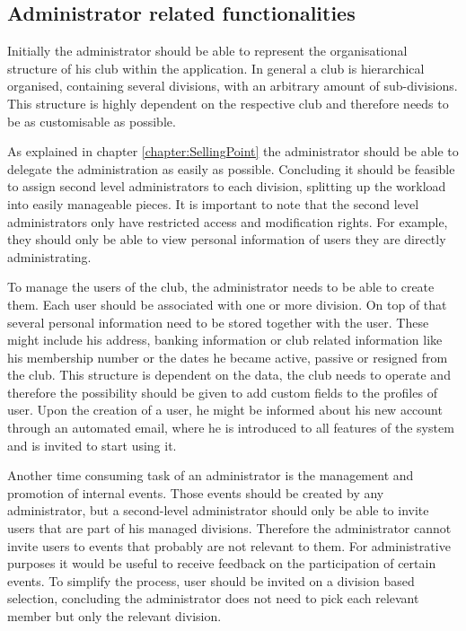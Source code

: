 \subsection{Administrator related functionalities}

Initially the administrator should be able to represent the organisational structure of his club within the application. In general a club is hierarchical organised, containing several divisions, with an arbitrary amount of sub-divisions. This structure is highly dependent on the respective club and therefore needs to be as customisable as possible. 

As explained in chapter \vref{chapter:SellingPoint} the administrator should be able to delegate the administration as easily as possible. Concluding it should be feasible to assign second level administrators to each division, splitting up the workload into easily manageable pieces. It is important to note that the second level administrators only have restricted access and modification rights. For example, they should only be able to view personal information of users they are directly administrating.

To manage the users of the club, the administrator needs to be able to create them. Each user should be associated with one or more division. On top of that several personal information need to be stored together with the user. These might include his address, banking information or club related information like his membership number or the dates he became active, passive or resigned from the club. This structure is dependent on the data, the club needs to operate and therefore the possibility should be given to add custom fields to the profiles of user. Upon the creation of a user, he might be informed about his new account through an automated email, where he is introduced to all features of the system and is invited to start using it.

Another time consuming task of an administrator is the management and promotion of internal events. Those events should be created by any administrator, but a second-level administrator should only be able to invite users that are part of his managed divisions. Therefore the administrator cannot invite users to events that probably are not relevant to them. For administrative purposes it would be useful to receive feedback on the participation of certain events. To simplify the process, user should be invited on a division based selection, concluding the administrator does not need to pick each relevant member but only the relevant division.

